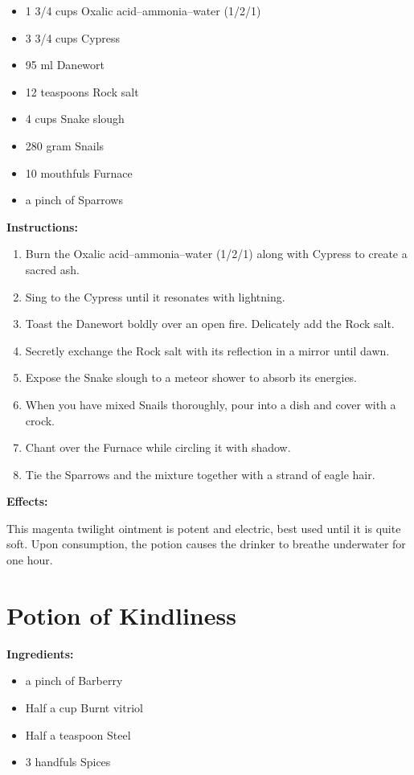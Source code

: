 \documentclass{article}
\begin{document}
\begin{itemize}
  \item 1 3/4 cups Oxalic acid--ammonia--water (1/2/1)
  \item 3 3/4 cups Cypress
  \item 95 ml Danewort
  \item 12 teaspoons Rock salt
  \item 4 cups Snake slough
  \item 280 gram Snails
  \item 10 mouthfuls Furnace
  \item a pinch of Sparrows
\end{itemize}

\textbf{Instructions:}

\begin{enumerate}
  \item Burn the Oxalic acid--ammonia--water (1/2/1) along with Cypress to create a sacred ash.
  \item Sing to the Cypress until it resonates with lightning.
  \item Toast the Danewort boldly over an open fire. Delicately add the Rock salt.
  \item Secretly exchange the Rock salt with its reflection in a mirror until dawn.
  \item Expose the Snake slough to a meteor shower to absorb its energies.
  \item When you have mixed Snails thoroughly, pour into a dish and cover with a crock.
  \item Chant over the Furnace while circling it with shadow.
  \item Tie the Sparrows and the mixture together with a strand of eagle hair.
\end{enumerate}

\textbf{Effects:}

This magenta twilight ointment is potent and electric, best used until it is quite soft. Upon consumption, the potion causes the drinker to breathe underwater for one hour.

\newpage
\section*{Potion of Kindliness}

\textbf{Ingredients:}

\begin{itemize}
  \item a pinch of Barberry
  \item Half a cup Burnt vitriol
  \item Half a teaspoon Steel
  \item 3 handfuls Spices
\end{itemize}
\end{document}
